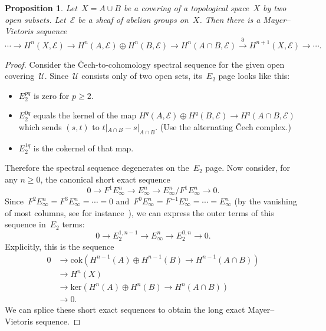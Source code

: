 \documentclass[10pt]{amsart}
\theoremstyle{definition}
\theoremstyle{plain}
\newtheorem{prop}[defn]{Proposition}
\theoremstyle{remark}
\newcommand{\E}{\mathcal{E}}
\newcommand{\U}{\mathcal{U}}
\newcommand{\lra}{\longrightarrow}
\begin{document}
\begin{prop}Let~$X = A \cup B$ be a covering of a topological space~$X$
by two open subsets. Let~$\E$ be a sheaf of abelian groups on~$X$. Then there
is a Mayer--Vietoris sequence
\[ \cdots \lra H^n(X, \E) \lra
  H^n(A, \E) \oplus H^n(B, \E) \lra
  H^n(A \cap B, \E) \stackrel{\partial}{\lra} H^{n+1}(X, \E) \lra \cdots. \]
\end{prop}
\begin{proof}Consider the Čech-to-cohomology spectral sequence for the
given open covering~$\U$. Since~$\U$ consists only of two open sets, its~$E_2$ page looks like this:
\begin{itemize}
\item $E_2^{pq}$ is zero for $p \geq 2$.
\item $E_2^{0q}$ equals the kernel of the map $H^q(A,\E) \oplus H^q(B,\E) \to H^q(A
\cap B,\E)$ which sends $(s,t)$ to $t|_{A \cap B} - s|_{A \cap B}$. (Use the
alternating Čech complex.)
\item $E_2^{1q}$ is the cokernel of that map.
\end{itemize}
Therefore the spectral sequence degenerates on the~$E_2$ page. Now
consider, for any $n \geq 0$, the canonical short exact sequence
\[ 0 \longrightarrow F^1 E_\infty^n \longrightarrow E_\infty^n
\longrightarrow E_\infty^n/F^1 E_\infty^n \longrightarrow 0. \]
Since~$F^2 E_\infty^n = F^3 E_\infty^n = \cdots = 0$ and~$F^0 E_\infty^n =
F^{-1} E_\infty^n = \cdots = E_\infty^n$ (by the vanishing of most
columns, see for instance~\cite{greenberg}),
we can express the outer terms of this sequence in~$E_2$ terms:
\[ 0 \longrightarrow E_2^{1,n-1} \longrightarrow E_\infty^n
\longrightarrow E_2^{0,n} \longrightarrow 0. \]
Explicitly, this is the sequence
\begin{align*}
  0 &\longrightarrow \mathrm{cok}(H^{n-1}(A) \oplus H^{n-1}(B) \to
H^{n-1}(A \cap B)) \\
  &\longrightarrow H^n(X) \\
  &\longrightarrow \mathrm{ker}(H^n(A) \oplus H^n(B) \to H^n(A \cap B)) \\
  &\longrightarrow 0.
\end{align*}
We can splice these short exact sequences to obtain the long exact
Mayer--Vietoris sequence.
\end{proof}
\end{document}
